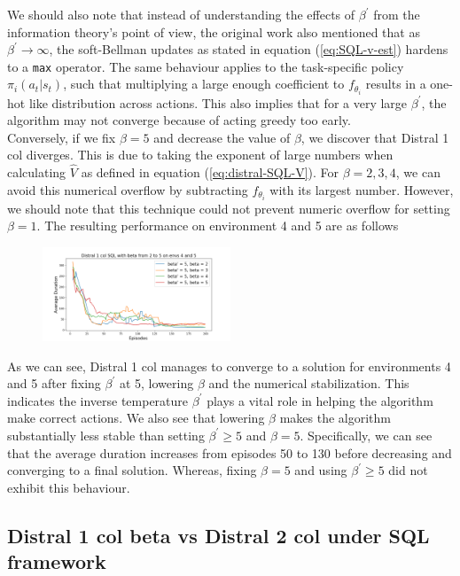 \documentclass[12pt]{report}
\begin{document}
We should also note that instead of understanding the effects of $\beta^\prime$ from the information theory's point of view, the original work \cite{teh2017distral} also mentioned that as $\beta^\prime \rightarrow \infty$, the soft-Bellman updates as stated in equation (\ref{eq:SQL-v-est}) hardens to a \texttt{max} operator. The same behaviour applies to the task-specific policy $\pi_i(a_t|s_t)$, such that multiplying a large enough coefficient to $f_{\theta_i}$ results in a one-hot like distribution across actions. This also implies that for a very large $\beta^\prime$, the algorithm may not converge because of acting greedy too early.\\

Conversely, if we fix $\beta = 5$ and decrease the value of $\beta$, we discover that Distral 1 col diverges. This is due to taking the exponent of large numbers when calculating $\hat{V}$ as defined in equation (\ref{eq:distral-SQL-V}). For $\beta = 2,3,4$, we can avoid this numerical overflow by subtracting $f_{\theta_i}$ with its largest number. However, we should note that this technique could not prevent numeric overflow for setting $\beta = 1$. The resulting performance on environment 4 and 5 are as follows
\begin{figure}[H]
\centering
\includegraphics[width=0.5\textwidth]{figs/betas/d1_SQL_2_to_5_b_avg_dur.png}
\end{figure}
As we can see, Distral 1 col manages to converge to a solution for environments 4 and 5 after fixing $\beta^\prime$ at 5, lowering $\beta$ and the numerical stabilization. This indicates the inverse temperature $\beta^\prime$ plays a vital role in helping the algorithm make correct actions. We also see that lowering $\beta$ makes the algorithm substantially less stable than setting $\beta^\prime \ge 5$ and $\beta = 5$. Specifically, we can see that the average duration increases from episodes 50 to 130 before decreasing and converging to a final solution. Whereas, fixing $\beta = 5$ and using $\beta^\prime \ge 5$ did not exhibit this behaviour.

\subsection{Distral 1 col beta vs Distral 2 col under SQL framework}
\end{document}
